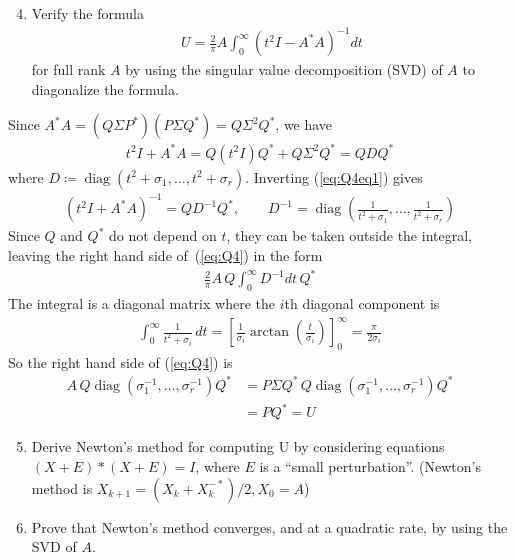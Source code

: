 \documentclass{article}
\DeclareMathOperator{\diag}{diag}
\begin{document}
\begin{enumerate}
	\setcounter{enumi}{3}
	\item Verify the formula
	\begin{align*}
		U = \frac{2}{\pi}A \int_{0}^{\infty} (t^2I - A^*A)^{-1}dt
		\tag{*}
		\label{eq:Q4}
	\end{align*}
	for full rank $A$ by using the singular value decomposition (SVD)
	of $A$ to diagonalize the formula.
\end{enumerate}

Since $A^*A = (Q\Sigma P^*)(P\Sigma Q^*) = Q\Sigma^2Q^*$, we have
\begin{align}
	t^2I + A^*A = Q(t^2I)Q^* + Q \Sigma^2Q^* = QDQ^*
	\label{eq:Q4eq1}
\end{align}
where $D \coloneqq \diag(t^2 + \sigma_1, \ldots, t^2 + \sigma_r)$.
Inverting (\ref{eq:Q4eq1}) gives
\begin{align}
	(t^2I + A^*A)^{-1} = QD^{-1}Q^*, \qquad
	D^{-1} = \diag\left(\frac{1}{t^2+\sigma_1}, \ldots, 
	\frac{1}{t^2+\sigma_r}\right)
\end{align}
Since $Q$ and $Q^*$ do not depend on $t$, they can be taken outside the 
integral, leaving the right hand side of~(\ref{eq:Q4}) in the form
\begin{align}
	\frac{2}{\pi} A\, Q\int_{0}^{\infty}D^{-1}dt\, Q^*
\end{align}
The integral is a diagonal matrix where the $i$th diagonal component is
\begin{align}
	\int_{0}^{\infty} \frac{1}{t^2 + \sigma_i} \, dt =
	\left[\frac{1}{\sigma_i} \arctan \left(\frac{t}{\sigma_i}\right)
	\right]_0^{\infty} = \frac{\pi}{2\sigma_i}
\end{align}
So the right hand side of (\ref{eq:Q4}) is
\begin{align}
	A\,Q\diag\left(\sigma_1^{-1},\ldots,\sigma_r^{-1}\right)Q^*&=
	P\Sigma Q^* \, Q
	\diag\left(\sigma_1^{-1},\ldots,\sigma_r^{-1}\right)Q^* \\
	&= PQ^* = U
\end{align}


\begin{enumerate}
	\setcounter{enumi}{4}
	\item Derive Newton's method for computing U by considering
	equations $(X+E)*(X+E) = I$, where $E$ is a ``small perturbation''.
	(Newton's method is $X_{k+1} = (X_k + X_k^{-*})/2, X_0 = A$)
\end{enumerate}



\begin{enumerate}
	\setcounter{enumi}{5}
	\item Prove that Newton's method converges, and at a quadratic
	rate, by using the SVD of $A$.
\end{enumerate}
\end{document}
